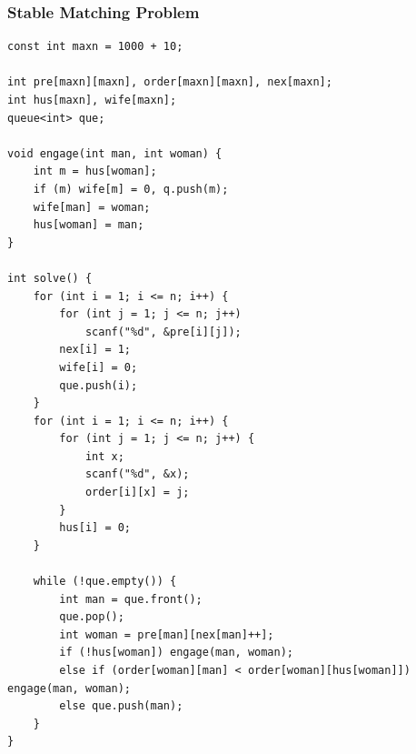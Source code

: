 \documentclass[twoside]{article}
\begin{document}
\subsubsection{Stable Matching Problem}
\begin{lstlisting}
const int maxn = 1000 + 10;

int pre[maxn][maxn], order[maxn][maxn], nex[maxn];
int hus[maxn], wife[maxn];
queue<int> que;

void engage(int man, int woman) {
    int m = hus[woman];
    if (m) wife[m] = 0, q.push(m);
    wife[man] = woman;
    hus[woman] = man;
}

int solve() {
    for (int i = 1; i <= n; i++) {
        for (int j = 1; j <= n; j++)
            scanf("%d", &pre[i][j]);
        nex[i] = 1;
        wife[i] = 0;
        que.push(i);
    }
    for (int i = 1; i <= n; i++) {
        for (int j = 1; j <= n; j++) {
            int x;
            scanf("%d", &x);
            order[i][x] = j;
        }
        hus[i] = 0;
    }

    while (!que.empty()) {
        int man = que.front();
        que.pop();
        int woman = pre[man][nex[man]++];
        if (!hus[woman]) engage(man, woman);
        else if (order[woman][man] < order[woman][hus[woman]]) engage(man, woman);
        else que.push(man);
    }
}\end{lstlisting}
\end{document}
